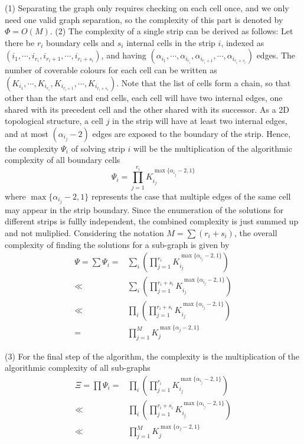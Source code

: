 \documentclass[conference]{IEEEtran}
\begin{document}
(1) Separating the graph only requires checking on each cell once, and we only need one valid graph separation, so the complexity of this part is denoted by $\Phi = O(M)$. 
(2) The complexity of a single strip can be derived as follows: Let there be $r_i$ boundary cells and $s_i$ internal cells in the strip $i$, 
indexed as $( i_1, \cdots, i_{r_i}, i_{r_i+1}, \cdots, i_{r_i+s_i})$, 
and having $(\alpha_{i_1}, \cdots, \alpha_{i_{r_i}}, \alpha_{i_{r_i+1}}, \cdots, \alpha_{i_{r_i+s_i}})$ edges. 
The number of coverable colours for each cell can be  written as $(K_{i_1}, \cdots, K_{i_{r_i}}, K_{i_{r_i+1}}, \cdots, K_{i_{r_i+s_i}})$. 
Note that the list of cells form a chain, so that other than the start and end cells, each cell will have two internal edges, one shared with its precedent cell and the 
other shared with its successor. As a 2D topological structure, a cell $j$ in the strip %
will have at least two internal edges, and at most $(\alpha_{i_j}-2)$ edges are exposed to the boundary of the strip. 
Hence, the complexity $\Psi_i$  of solving strip $i$ will be the multiplication of the algorithmic complexity of all boundary cells 
\begin{equation}
\Psi_i = \prod\limits_{j = 1}^{r_i} K_{i_j}^{\max\{\alpha_{i_j}-2, 1\}}
\end{equation}
where $\max\{\alpha_{i_j}-2, 1\}$ represents the case that multiple edges of the same cell may appear in the strip boundary. 
Since the enumeration of the solutions for different strips is fullly independent, the combined complexity is just summed up and not muliplied. 
Considering the notation $M = \sum (r_i+s_i)$, the overall complexity of finding the solutions for a sub-graph is given by
\begin{equation}
\begin{aligned}
\Psi = \sum \Psi_i = & \sum\limits_{i} \left(\prod\limits_{j = 1}^{r_i} K_{i_j}^{\max\{\alpha_{i_j}-2, 1\}}\right)\\
\ll & \sum\limits_{i} \left(\prod\limits_{j = 1}^{r_i+s_i} K_{i_j}^{\max\{\alpha_{i_j}-2, 1\}}\right)\\
\ll&\prod\limits_{i}\left(\prod\limits_{j = 1}^{r_i+s_i} K_{i_j}^{\max\{\alpha_{i_j}-2, 1\}}\right)\\
=&\prod\limits_{j = 1}^M K_j^{\max\{\alpha_j -2, 1\}}
\end{aligned}
\end{equation}

(3) For the final step of the algorithm, the complexity is the multiplication of the algorithmic complexity of all sub-graphs 
\begin{equation}
\begin{aligned}
\Xi = \prod \Psi_i = & \prod\limits_i \left(\prod\limits_{j = 1}^{r_i} K_{i_j}^{\max\{\alpha_{i_j}-2, 1\}}\right)\\
\ll&  \prod\limits_i \left(\prod\limits_{j = 1}^{r_i+s_i} K_{i_j}^{\max\{\alpha_{i_j}-2, 1\}}\right)\\
\ll& \prod\limits_{j = 1}^M K_j^{\max\{\alpha_j-2, 1\}}
\end{aligned}
\end{equation}
\end{document}
